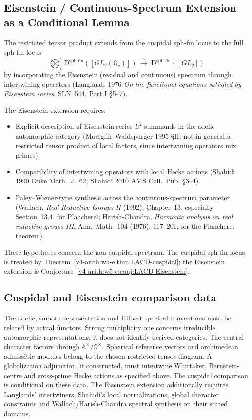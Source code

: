 \subsection{Eisenstein / Continuous-Spectrum Extension as a Conditional Lemma}

\begin{conjecture}
\label{v4-arith:w5-e:conj:LACD-Eisenstein}
\ClaimStatusConjectured The restricted tensor product extends from
the cuspidal sph-fin locus to the full sph-fin locus
\[
\bigotimes_{v}^{\prime}\mathrm{D}^{\mathrm{sph\text{-}fin}}([GL_{2}(\mathbb{Q}_{v})])
\;\xrightarrow{\;\sim\;}\;
\mathrm{D}^{\mathrm{sph\text{-}fin}}([GL_{2}])
\]
by incorporating the Eisenstein (residual and continuous) spectrum
through intertwining operators
(Langlands 1976 \emph{On the functional equations satisfied by
Eisenstein series}, SLN~544, Part I \S 5--7).
\end{conjecture}

\begin{remark}
\label{v4-arith:w5-e:rem:LACD-Eisenstein-domain}
The Eisenstein extension requires:
\begin{itemize}
\item Explicit description of Eisenstein-series \(L^{2}\)-summands in
the adelic automorphic category (Mo{\oe}glin--Waldspurger 1995 \S II;
not in general a restricted tensor product of local factors, since
intertwining operators mix primes).
\item Compatibility of intertwining operators with local Hecke
actions (Shahidi 1990 Duke Math.~J.~62; Shahidi 2010 AMS Coll.~Pub.
\S 3--4).
\item Paley--Wiener-type synthesis across the continuous-spectrum
parameter (Wallach, \emph{Real Reductive Groups II} (1992), Chapter~13,
especially Section~13.4, for Plancherel; Harish-Chandra,
\emph{Harmonic analysis on real reductive groups III}, Ann.\ Math.~104
(1976), 117--201, for the Plancherel theorem).
\end{itemize}
These hypotheses concern the non-cuspidal spectrum. The cuspidal
sph-fin locus is treated by Theorem~\ref{v4-arith:w5-e:thm:LACD-cuspidal};
the Eisenstein extension is Conjecture~\ref{v4-arith:w5-e:conj:LACD-Eisenstein}.
\end{remark}
\subsection{Cuspidal and Eisenstein comparison data}
The adelic, smooth representation and Hilbert spectral conventions
must be related by actual functors. Strong multiplicity one concerns
irreducible automorphic representations; it does not identify derived
categories. The central character factors through
$\mathbb A^\times/\mathbb Q^\times$. Spherical reference vectors and
archimedean admissible modules belong to the chosen restricted tensor
diagram. A globalization adjunction, if constructed, must intertwine
Whittaker, Bernstein-centre and cross-prime Hecke actions as specified
above. The cuspidal comparison is conditional on these data. The
Eisenstein extension additionally requires Langlands' intertwiners,
Shahidi's local normalizations, global character constraints and
Wallach/Harish-Chandra spectral synthesis on their stated domains.
